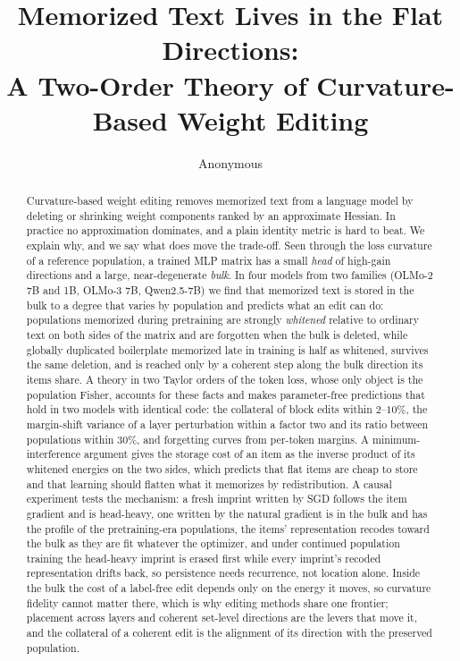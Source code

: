 \documentclass{article}
\title{Memorized Text Lives in the Flat Directions:\\ A Two-Order Theory of Curvature-Based Weight Editing}
\author{%
  Anonymous\\
}
\theoremstyle{definition}\newtheorem{law}{Empirical law}
\begin{document}
\maketitle

\begin{abstract}
Curvature-based weight editing removes memorized text from a language model by deleting or shrinking weight components ranked by an approximate Hessian. In practice no approximation dominates, and a plain identity metric is hard to beat. We explain why, and we say what does move the trade-off. Seen through the loss curvature of a reference population, a trained MLP matrix has a small \emph{head} of high-gain directions and a large, near-degenerate \emph{bulk}. In four models from two families (OLMo-2 7B and 1B, OLMo-3 7B, Qwen2.5-7B) we find that memorized text is stored in the bulk to a degree that varies by population and predicts what an edit can do: populations memorized during pretraining are strongly \emph{whitened} relative to ordinary text on both sides of the matrix and are forgotten when the bulk is deleted, while globally duplicated boilerplate memorized late in training is half as whitened, survives the same deletion, and is reached only by a coherent step along the bulk direction its items share. A theory in two Taylor orders of the token loss, whose only object is the population Fisher, accounts for these facts and makes parameter-free predictions that hold in two models with identical code: the collateral of block edits within $2$--$10\%$, the margin-shift variance of a layer perturbation within a factor two and its ratio between populations within $30\%$, and forgetting curves from per-token margins. A minimum-interference argument gives the storage cost of an item as the inverse product of its whitened energies on the two sides, which predicts that flat items are cheap to store and that learning should flatten what it memorizes by redistribution. A causal experiment tests the mechanism: a fresh imprint written by SGD follows the item gradient and is head-heavy, one written by the natural gradient is in the bulk and has the profile of the pretraining-era populations, the items' representation recodes toward the bulk as they are fit whatever the optimizer, and under continued population training the head-heavy imprint is erased first while every imprint's recoded representation drifts back, so persistence needs recurrence, not location alone. Inside the bulk the cost of a label-free edit depends only on the energy it moves, so curvature fidelity cannot matter there, which is why editing methods share one frontier; placement across layers and coherent set-level directions are the levers that move it, and the collateral of a coherent edit is the alignment of its direction with the preserved population.
\end{abstract}
\end{document}
